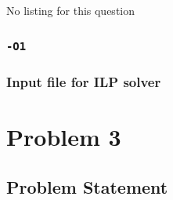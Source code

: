\documentclass[12pt,a4paper,titlepage,oneside]{article}
\begin{document}
\subsubsection{}
No listing for this question

\subsubsection{\texttt{-O1}}


\subsubsection{Input file for ILP solver}

\newpage
\section{Problem 3}

\subsection{Problem Statement}

\end{document}
